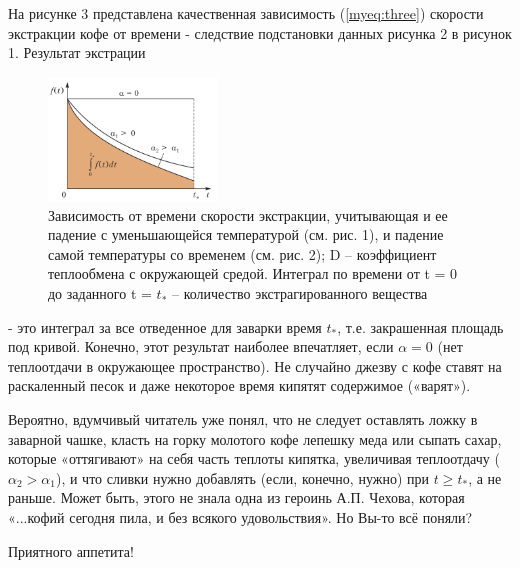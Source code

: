 \begin{multicols*}{2}
	На рисунке 3 представлена качественная зависимость (\ref{myeq:three}) скорости экстракции кофе от времени - следствие подстановки
	данных рисунка 2 в рисунок 1. Результат экстрации
	\setlength{\belowcaptionskip}{-10pt} 
	\begin{figure}[H]
		\centering
		\includegraphics[width=0.4\textwidth]{pic2.png}
		\caption{Зависимость от времени скорости экстракции, учитывающая и ее падение с уменьшающейся температурой (см. рис. 1), и падение
			самой температуры со временем (см. рис. 2);
			D – коэффициент теплообмена с окружающей
			средой. Интеграл по времени от t = 0 до
			заданного t = $t_*$
			– количество экстрагированного вещества}
	\end{figure}
	\noindent
	- это интеграл за все отведенное для заварки время $t_*$, т.е. закрашенная площадь под кривой. Конечно, этот
	результат наиболее впечатляет, если $\alpha = 0$ (нет теплоотдачи в окружающее пространство). Не случайно
	джезву с кофе ставят на раскаленный песок и даже некоторое время кипятят содержимое («варят»).
	
	Вероятно, вдумчивый читатель уже понял, что не следует оставлять ложку в заварной чашке, класть на горку
	молотого кофе лепешку меда или сыпать сахар, которые «оттягивают» на себя часть теплоты кипятка, увеличивая
	теплоотдачу ($\alpha_2 > \alpha_1$), и что сливки нужно добавлять (если, конечно, нужно) при
	$t\geq t_*$, а не раньше. Может быть, этого не знала одна из героинь А.П. Чехова, которая «...кофий сегодня пила,
	и без всякого удовольствия». Но Вы-то всё поняли?
	
	Приятного аппетита!
\end{multicols*}
\newpage
